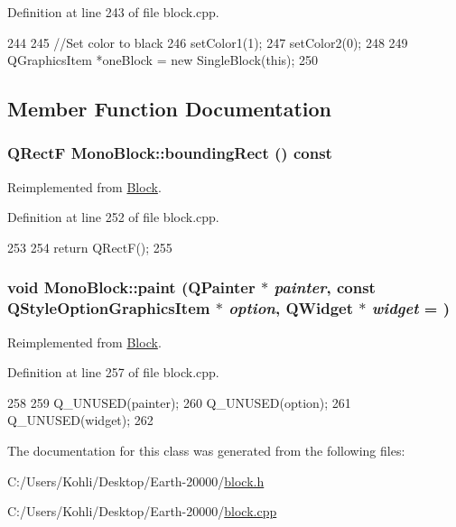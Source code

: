 Definition at line 243 of file block.cpp.


\begin{DoxyCode}
244 {
245     //Set color to black
246     setColor1(1);
247     setColor2(0);
248 
249     QGraphicsItem *oneBlock = new SingleBlock(this);
250 }
\end{DoxyCode}


\subsection{Member Function Documentation}
\hypertarget{class_mono_block_ae85adc70af0318603a03c2daf768c145}{
\subsubsection[{boundingRect}]{\setlength{\rightskip}{0pt plus 5cm}QRectF MonoBlock::boundingRect () const}}
\label{class_mono_block_ae85adc70af0318603a03c2daf768c145}


Reimplemented from \hyperlink{class_block_aee4444b92a82f5a8080e9019ef1e554d}{Block}.

Definition at line 252 of file block.cpp.


\begin{DoxyCode}
253 {
254     return QRectF();
255 }
\end{DoxyCode}
\hypertarget{class_mono_block_a8c2d5b6508508633c4c3234790945c51}{
\subsubsection[{paint}]{\setlength{\rightskip}{0pt plus 5cm}void MonoBlock::paint (QPainter $\ast$ {\em painter}, \/  const QStyleOptionGraphicsItem $\ast$ {\em option}, \/  QWidget $\ast$ {\em widget} = {})}}
\label{class_mono_block_a8c2d5b6508508633c4c3234790945c51}


Reimplemented from \hyperlink{class_block_a36791d086b6fad1a2203bfef6fdbaa0a}{Block}.

Definition at line 257 of file block.cpp.


\begin{DoxyCode}
258 {
259     Q_UNUSED(painter);
260     Q_UNUSED(option);
261     Q_UNUSED(widget);
262 }
\end{DoxyCode}


The documentation for this class was generated from the following files:\begin{DoxyCompactItemize}
\item 
C:/Users/Kohli/Desktop/Earth-\/20000/\hyperlink{block_8h}{block.h}\item 
C:/Users/Kohli/Desktop/Earth-\/20000/\hyperlink{block_8cpp}{block.cpp}\end{DoxyCompactItemize}
